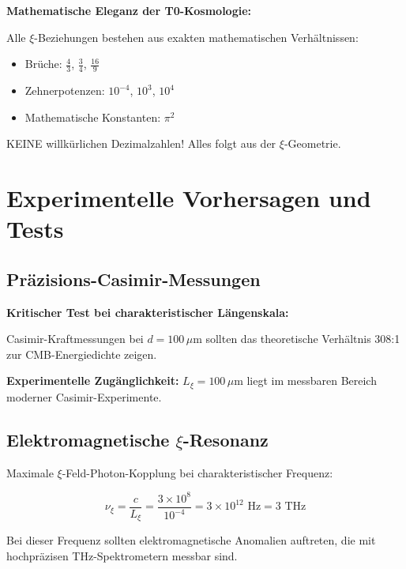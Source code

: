 \documentclass[12pt,a4paper]{article}
\newcommand{\Lxi}{L_\xi}
\begin{document}
	\begin{warning}
		\textbf{Mathematische Eleganz der T0-Kosmologie:}
		
		Alle $\xi$-Beziehungen bestehen aus exakten mathematischen Verhältnissen:
		\begin{itemize}
			\item Brüche: $\frac{4}{3}$, $\frac{3}{4}$, $\frac{16}{9}$
			\item Zehnerpotenzen: $10^{-4}$, $10^3$, $10^4$
			\item Mathematische Konstanten: $\pi^2$
		\end{itemize}
		
		KEINE willkürlichen Dezimalzahlen! Alles folgt aus der $\xi$-Geometrie.
	\end{warning}
	
	\section{Experimentelle Vorhersagen und Tests}
	
	\subsection{Präzisions-Casimir-Messungen}
	
	\begin{experiment}
		\textbf{Kritischer Test bei charakteristischer Längenskala:}
		
		Casimir-Kraftmessungen bei $d = 100\,\mu$m sollten das theoretische Verhältnis 308:1 zur CMB-Energiedichte zeigen.
		
		\textbf{Experimentelle Zugänglichkeit:} $\Lxi = 100\,\mu$m liegt im messbaren Bereich moderner Casimir-Experimente.
	\end{experiment}
	
	\subsection{Elektromagnetische $\xi$-Resonanz}
	
	Maximale $\xi$-Feld-Photon-Kopplung bei charakteristischer Frequenz:
	
	\begin{equation}
		\nu_\xi = \frac{c}{\Lxi} = \frac{3 \times 10^8}{10^{-4}} = 3 \times 10^{12} \text{ Hz} = 3 \text{ THz}
	\end{equation}
	
	Bei dieser Frequenz sollten elektromagnetische Anomalien auftreten, die mit hochpräzisen THz-Spektrometern messbar sind.
	
\end{document}
